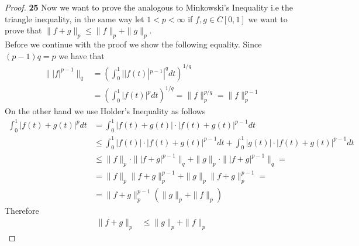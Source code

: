 \documentclass[11pt]{article}
\theoremstyle{definition}
\begin{document}
\begin{proof}{\textbf{25}}
        Now we want to prove the analogous to Minkowski's Inequality i.e the triangle
        inequality, in the same way let $1 <p<\infty$ if $f,g \in C[0,1]$ we want to
        prove that $\|f +g\|_p \leq \|f\|_p + \|g\|_p$.\\
        Before we continue with the proof we show the following equality.
        Since $(p-1)q = p$ we have that
        \begin{align*}
            \||f|^{p-1}\|_q &= \left(\int_0^1 ||f(t)|^{p-1}|^q dt\right)^{1/q}\\
                &= \left(\int_0^1 |f(t)|^p dt\right)^{1/q} = \|f\|_p^{p/q} = \|f\|_p^{p-1}
        \end{align*}
        On the other hand we use Holder's Inequality as follows
        \begin{align*}
            \int_0^1 |f(t) + g(t)|^pdt &= \int_0^1 |f(t) + g(t)|\cdot|f(t) + g(t)|^{p-1}dt\\
                &\leq \int_0^1 |f(t)|\cdot|f(t) + g(t)|^{p-1} dt +
                \int_0^1 |g(t)|\cdot|f(t) + g(t)|^{p-1}dt\\
                &\leq \|f\|_p \cdot \||f+g|^{p-1}\|_q + \|g\|_p \cdot \||f+g|^{p-1}\|_q =\\
                &= \|f\|_p \|f + g\|_p^{p-1} + \|g\|_p \|f + g\|_p^{p-1} =\\
                &= \|f + g\|_p^{p-1} (\|g\|_p + \|f\|_p)
        \end{align*}
        Therefore
        \begin{align*}
            \|f +g\|_p &\leq \|g\|_p + \|f\|_p
        \end{align*}
    \end{proof}
\end{document}
